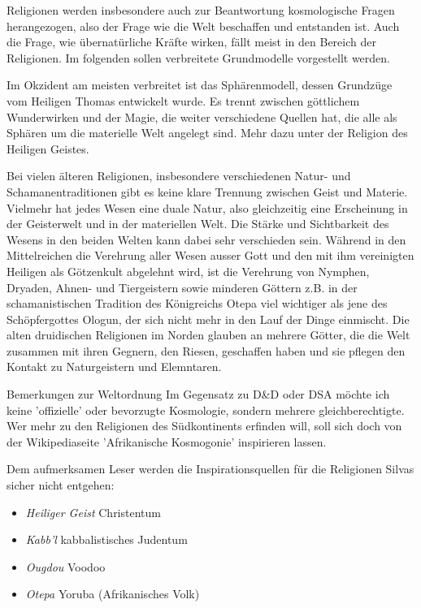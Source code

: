 \documentclass[12pt,twoside,twocolumn,openany]{book}
\begin{document}
	Religionen werden insbesondere auch zur Beantwortung kosmologische Fragen herangezogen, also der Frage wie die Welt beschaffen und entstanden ist. Auch die Frage, wie übernatürliche Kräfte wirken, fällt meist in den Bereich der Religionen.
	Im folgenden sollen verbreitete Grundmodelle vorgestellt werden.
	
	Im Okzident am meisten verbreitet ist das Sphärenmodell, dessen Grundzüge vom Heiligen Thomas entwickelt wurde. Es trennt zwischen göttlichem Wunderwirken und der Magie, die weiter verschiedene Quellen hat, die alle als Sphären um die materielle Welt angelegt sind. Mehr dazu unter der Religion des Heiligen Geistes.
	
	Bei vielen älteren Religionen, insbesondere verschiedenen Natur- und Schamanentraditionen gibt es keine klare Trennung zwischen Geist und Materie. Vielmehr hat jedes Wesen eine duale Natur, also gleichzeitig eine Erscheinung in der Geisterwelt und in der materiellen Welt. Die Stärke und Sichtbarkeit des Wesens in den beiden Welten kann dabei sehr verschieden sein. Während in den Mittelreichen die Verehrung aller Wesen ausser Gott und den mit ihm vereinigten Heiligen als Götzenkult abgelehnt wird, ist die Verehrung von Nymphen, Dryaden, Ahnen- und Tiergeistern sowie minderen Göttern z.B. in der schamanistischen Tradition des Königreichs Otepa viel wichtiger als jene des Schöpfergottes Ologun, der sich nicht mehr in den Lauf der Dinge einmischt. Die alten druidischen Religionen im Norden glauben an mehrere Götter, die die Welt zusammen mit ihren Gegnern, den Riesen, geschaffen haben und sie pflegen den Kontakt zu Naturgeistern und Elemntaren.

\begin{table}[htpb]
	\begin{commentbox}{Bemerkungen zur Weltordnung}
		Im Gegensatz zu D\&D oder DSA möchte ich keine 'offizielle' oder bevorzugte Kosmologie, sondern mehrere gleichberechtigte. Wer mehr zu den Religionen des Südkontinents erfinden will, soll sich doch von der Wikipediaseite 'Afrikanische Kosmogonie' inspirieren lassen.
		
		Dem aufmerksamen Leser werden die Inspirationsquellen für die Religionen Silvas sicher nicht entgehen:
		\begin{itemize}
			\item \emph{Heiliger Geist} Christentum
			\item \emph{Kabb'l} kabbalistisches Judentum
			\item \emph{Ougdou} Voodoo
			\item \emph{Otepa} Yoruba (Afrikanisches Volk)
		\end{itemize}
	\end{commentbox}
\end{table}
	
\end{document}
